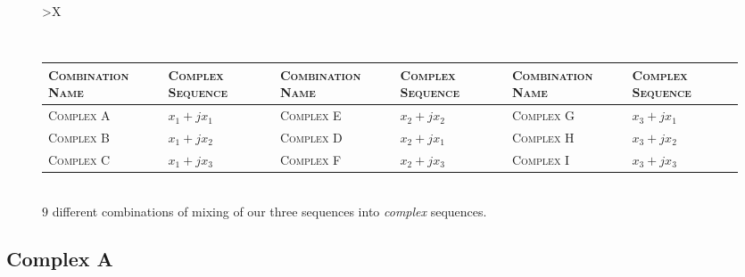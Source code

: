 \documentclass[../../course]{subfiles}
\begin{document}
\begin{figure} [H]
    \centering

    \begin{tabularx} {\textwidth} {
            *{1}{>{\centering\arraybackslash}X}
        }

        \\

        { \begin{tabularx} {\textwidth} {
                *{6}{>{\centering\arraybackslash}X}
            }

            \toprule
            \textsc{Combination Name} & \textsc{Complex Sequence} &
            \textsc{Combination Name} & \textsc{Complex Sequence} &
            \textsc{Combination Name} & \textsc{Complex Sequence} \\
            \midrule

            \textsc{Complex A} & $x_{1} + j x_{1}$ &
            \textsc{Complex E} & $x_{2} + j x_{2}$ &
            \textsc{Complex G} & $x_{3} + j x_{1}$ \\

            \textsc{Complex B} & $x_{1} + j x_{2}$ &
            \textsc{Complex D} & $x_{2} + j x_{1}$ &
            \textsc{Complex H} & $x_{3} + j x_{2}$ \\

            \textsc{Complex C} & $x_{1} + j x_{3}$ &
            \textsc{Complex F} & $x_{2} + j x_{3}$ &
            \textsc{Complex I} & $x_{3} + j x_{3}$ \\

            \bottomrule

        \end{tabularx} } \\

         {
            $9$ different combinations of mixing of our three sequences into \emph{complex}
            sequences.
        }
        \label{tbl:cplxSeqs}
        \\

    \end{tabularx}


\end{figure}

\subsection{Complex A}
\end{document}
